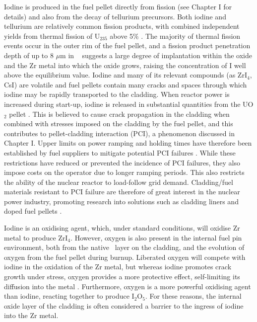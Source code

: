 Iodine is produced in the fuel pellet directly from fission (see Chapter I for details) and also from the decay of tellurium precursors. Both iodine and tellurium are relatively common fission products, with combined independent yields from thermal fission of U$_{235}$ above 5\% \cite{kennett1956mass, iodine129fissionyield, imanishi1976independent, iodinefissionyields, iodine132, amiel1975odd}. The majority of thermal fission events occur in the outer rim of the fuel pellet, and a fission product penetration depth of up to 8 $\mu$m in \zirconia\ \cite{degueldre2001behaviour} suggests a large degree of implantation within the oxide and the Zr metal into which the oxide grows, raising the concentration of I well above the equilibrium value. Iodine and many of its relevant compounds (as ZrI$_{4}$, CsI) are volatile and fuel pellets contain many cracks and spaces through which iodine may be rapidly transported to the cladding. When reactor power is increased during start-up, iodine is released in substantial quantities from the UO$_{2}$ pellet \cite{peehs1982experimental}. This is believed to cause crack propagation in the cladding when combined with stresses imposed on the cladding by the fuel pellet, and this contributes to pellet-cladding interaction (PCI), a phenomenon discussed in Chapter I. Upper limits on power ramping and holding times have therefore been established by fuel suppliers to mitigate potential PCI failures \cite{yagnik2005effect}. While these restrictions have reduced or prevented the incidence of PCI failures, they also impose costs on the operator due to longer ramping periods. This also restricts the ability of the nuclear reactor to load-follow grid demand. Cladding/fuel materials resistant to PCI failure are therefore of great interest in the nuclear power industry, promoting research into solutions such as cladding liners and doped fuel pellets \cite{nonon2005pci,yang2012effect}. 



Iodine is an oxidising agent, which, under standard conditions, will oxidise Zr metal to produce ZrI$_{4}$. However, oxygen is also present in the internal fuel pin environment, both from the native \zirconia\ layer on the cladding, and the evolution of oxygen from the fuel pellet during burnup. Liberated oxygen will compete with iodine in the oxidation of the Zr metal, but whereas iodine promotes crack growth under stress, oxygen provides a more protective effect, self-limiting its diffusion into the metal \cite{farina2002stress, causey2005review}. Furthermore, oxygen is a more powerful oxidising agent than iodine, reacting together to produce I${_2}$O$_{5}$. For these reasons, the internal oxide layer of the cladding is often considered a barrier to the ingress of iodine into the Zr metal. 

